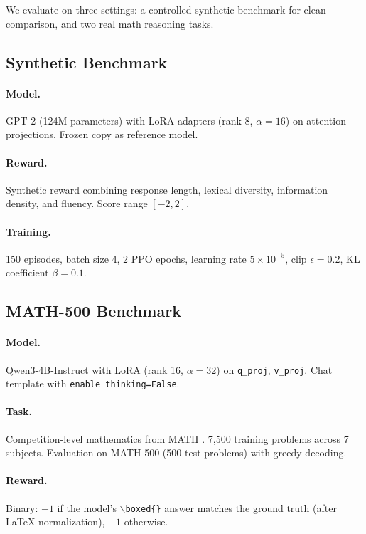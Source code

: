 \documentclass[11pt,a4paper]{article}
\begin{document}
We evaluate on three settings: a controlled synthetic benchmark for clean comparison, and two real math reasoning tasks.

\subsection{Synthetic Benchmark}

\paragraph{Model.} GPT-2 (124M parameters) with LoRA adapters (rank 8, $\alpha = 16$) on attention projections. Frozen copy as reference model.

\paragraph{Reward.} Synthetic reward combining response length, lexical diversity, information density, and fluency. Score range $[-2, 2]$.

\paragraph{Training.} 150 episodes, batch size 4, 2 PPO epochs, learning rate $5 \times 10^{-5}$, clip $\epsilon = 0.2$, KL coefficient $\beta = 0.1$.

\subsection{MATH-500 Benchmark}

\paragraph{Model.} Qwen3-4B-Instruct with LoRA (rank 16, $\alpha = 32$) on \texttt{q\_proj}, \texttt{v\_proj}. Chat template with \texttt{enable\_thinking=False}.

\paragraph{Task.} Competition-level mathematics from MATH \citep{hendrycks2021math}. 7,500 training problems across 7 subjects. Evaluation on MATH-500 (500 test problems) with greedy decoding.

\paragraph{Reward.} Binary: $+1$ if the model's $\backslash$\texttt{boxed\{\}} answer matches the ground truth (after LaTeX normalization), $-1$ otherwise.
\end{document}
